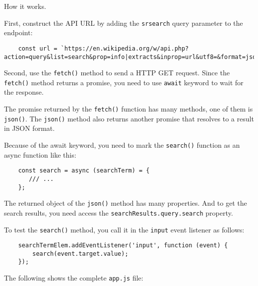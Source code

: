 \documentclass[11pt]{article}
\begin{document}
\noindent
How it works.
\newline

\noindent
First, construct the API URL by adding the \verb|srsearch| query parameter
to the endpoint:

\begin{lstlisting}
    const url = `https://en.wikipedia.org/w/api.php?action=query&list=search&prop=info|extracts&inprop=url&utf8=&format=json&origin=*&srlimit=10&srsearch=${searchTerm}`;
\end{lstlisting}

\noindent
Second, use the \verb|fetch()| method to send a HTTP GET request. Since
the \verb|fetch()| method returns a promise, you need to use \verb|await| keyword
to wait for the response.
\newline

\noindent
The promise returned by the \verb|fetch()| function has many methods,
one of them is \verb|json()|. The \verb|json()| method also returns another promise
that resolves to a result in JSON format.
\newline

\noindent
Because of the await keyword, you need to mark the \verb|search()| function
as an async function like this:

\begin{lstlisting}
    const search = async (searchTerm) = {
       /// ...
    };
\end{lstlisting}

\noindent
The returned object of the \verb|json()| method has many properties.
And to get the search results, you need access
the \verb|searchResults.query.search| property.
\newline

\noindent
To test the \verb|search()| method, you call it in the \verb|input| event
listener as follows:

\begin{lstlisting}
    searchTermElem.addEventListener('input', function (event) {
        search(event.target.value);
    });
\end{lstlisting}

\noindent
The following shows the complete \verb|app.js| file:
\end{document}
